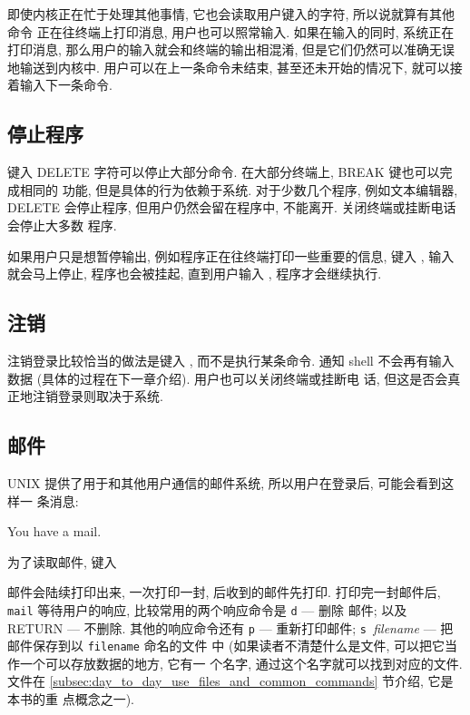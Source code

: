 即使内核正在忙于处理其他事情, 它也会读取用户键入的字符, 所以说就算有其他命令
正在往终端上打印消息, 用户也可以照常输入. 如果在输入的同时, 系统正在打印消息,
那么用户的输入就会和终端的输出相混淆, 但是它们仍然可以准确无误地输送到内核中.
用户可以在上一条命令未结束, 甚至还未开始的情况下, 就可以接着输入下一条命令.

\subsection{停止程序}
\label{subsec:stopping_a_program}

键入 DELETE 字符可以停止大部分命令. 在大部分终端上, BREAK 键也可以完成相同的
功能, 但是具体的行为依赖于系统. 对于少数几个程序, 例如文本编辑器, DELETE
会停止程序, 但用户仍然会留在程序中, 不能离开. 关闭终端或挂断电话会停止大多数
程序.

如果用户只是想暂停输出, 例如程序正在往终端打印一些重要的信息, 键入 ,
输入就会马上停止, 程序也会被挂起, 直到用户输入 , 程序才会继续执行.

\subsection{注销}
\label{subsec:logging_out}

注销登录比较恰当的做法是键入 , 而不是执行某条命令.  通知
shell 不会再有输入数据 (具体的过程在下一章介绍). 用户也可以关闭终端或挂断电
话, 但这是否会真正地注销登录则取决于系统.

\subsection{邮件}
\label{subsec:mail}

UNIX 提供了用于和其他用户通信的邮件系统, 所以用户在登录后, 可能会看到这样一
条消息:
\begin{upeshell}
You have a mail.
\end{upeshell}
为了读取邮件, 键入
邮件会陆续打印出来, 一次打印一封, 后收到的邮件先打印. 打印完一封邮件后,
\texttt{mail} 等待用户的响应, 比较常用的两个响应命令是 \texttt{d} --- 删除
邮件; 以及 RETURN --- 不删除. 其他的响应命令还有 \texttt{p} --- 重新打印邮件;
\texttt{s }\textit{filename} --- 把邮件保存到以 \texttt{filename} 命名的文件
中 (如果读者不清楚什么是文件, 可以把它当作一个可以存放数据的地方, 它有一
个名字, 通过这个名字就可以找到对应的文件. 文件在
\ref{subsec:day_to_day_use_files_and_common_commands} 节介绍, 它是本书的重
点概念之一).

